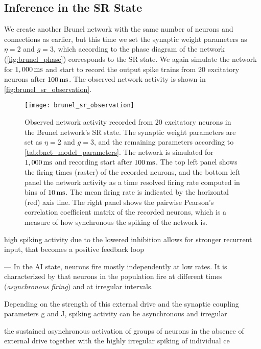 \subsection{Inference in the SR State}

We create another Brunel network with the same number of neurons and connections as earlier, but this time we set the synaptic weight parameters as $\eta=2$ and $g=3$, which according to the phase diagram of the network (\autoref{fig:brunel_phase}) corresponds to the SR state. We again simulate the network for $1,000 \,\mathrm{ms}$ and start to record the output spike trains from $20$ excitatory neurons after $100 \,\mathrm{ms}$. The observed network activity is shown in \autoref{fig:brunel_sr_observation}.
\begin{figure}[!htb]
    \centering
    \texttt{[image: brunel\_sr\_observation]}
    \caption{Observed network activity recorded from $20$ excitatory neurons in the Brunel network's SR state. The synaptic weight parameters are set as $\eta=2$ and $g=3$, and the remaining parameters according to \autoref{tab:bnet_model_parameters}. The network is simulated for  $1,000 \,\mathrm{ms}$ and recording start after $100 \,\mathrm{ms}$. The top left panel shows the firing times (raster) of the recorded neurons, and the bottom left panel the network activity as a time resolved firing rate computed in bins of $10 \,\mathrm{ms}$. The mean firing rate is indicated by the horizontal (red) axis line. The right panel shows the pairwise Pearson's correlation coefficient matrix of the recorded neurons, which is a measure of how synchronous the spiking of the network is. 
    }
    \label{fig:brunel_sr_observation}
\end{figure}

high spiking activity due to the lowered inhibition allows for stronger recurrent input, that becomes a positive feedback loop

---
In the AI state, neurons fire mostly independently at low rates. It is characterized by that neurons in the population fire at different times (\textit{asynchronous firing}) and at irregular intervals. 

Depending on the strength of this external drive and the synaptic coupling parameters g and J, spiking activity can be asynchronous and irregular

the sustained asynchronous activation of groups of neurons in the absence of external drive together with the highly irregular spiking of individual ce

